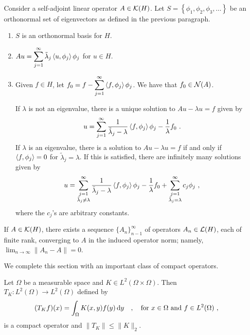 \begin{theorem} \label{fu_an_HStheorem}
Consider a self-adjoint linear operator $A \in \mathcal{K}(H)$.
Let $\displaystyle S = \left\{ \phi_1, \phi_2, \phi_3, \ldots \right\}$ be
an orthonormal set of eigenvectors as defined in the previous
paragraph.
\begin{enumerate}
\item $S$ is an orthonormal basis for $H$.
\item $\displaystyle Au =
\sum_{j=1}^{\infty} \tilde{\lambda}_j \left\langle{u} , {\phi_j}\right\rangle\phi_j$ for $u \in H$.
\item Given $f\in H$, let
$\displaystyle f_0 = f - \sum_{j=1}^{\infty} \left\langle{f} , {\phi_j}\right\rangle\phi_j$.
We have that $f_0 \in \mathcal{N}(A)$.

If $\lambda$ is not an eigenvalue, there is a unique solution
to $\displaystyle Au - \lambda u = f$ given by
\[
u = \sum_{j=1}^{\infty} \frac{1}{\tilde{\lambda}_j-\lambda}
\left\langle{f} , {\phi_j}\right\rangle \phi_j - \frac{1}{\lambda} f_0 \ .
\]
If $\lambda$ is an eigenvalue, there is a solution to
$\displaystyle Au - \lambda u = f$ if and only if
$\displaystyle \left\langle{f} , {\phi_j}\right\rangle = 0$ for $\tilde{\lambda}_j = \lambda$.
If this is satisfied, there are infinitely many solutions given by
\[
u = \sum_{\substack{j=1\\ \tilde{\lambda}_j\neq \lambda}}^\infty
\frac{1}{\tilde{\lambda}_j-\lambda} \left\langle{f} , {\phi_j}\right\rangle \phi_j -
\frac{1}{\lambda} f_0
+ \sum_{\substack{j=1\\ \tilde{\lambda}_j  = \lambda}}^\infty c_j \phi_j \ ,
\]
where the $c_j$'s are arbitrary constants.
\end{enumerate}
\end{theorem}

\begin{theorem}
If $A \in \mathcal{K}(H)$, there exists a sequence
$\displaystyle \{A_n\}_{n-1}^\infty$ of
operators $A_n \in \mathcal{L}(H)$, each of finite rank, converging to $A$ in
the induced operator norm; namely,
$\displaystyle \lim_{n\rightarrow \infty} \|A_n-A\| = 0$.
\end{theorem}

We complete this section with an important class of compact operators.

\begin{theorem} \label{fu_an_HSKern}
Let $\Omega$ be a measurable space and
$\displaystyle K \in L^2(\Omega\times \Omega)$.  Then
$\displaystyle T_K:L^2(\Omega)\rightarrow L^2(\Omega)$ defined by
\[
(T_K f)(x) = \int_{\Omega} K(x,y) f(y) \,\mathrm{d}{y} \quad ,
\quad \text{for}\ x \in \Omega
\ \text{and} \ f \in L^2(\Omega) \ ,
\]
is a compact operator and $\|T_K\| \leq \|K\|_2$.
\end{theorem}

